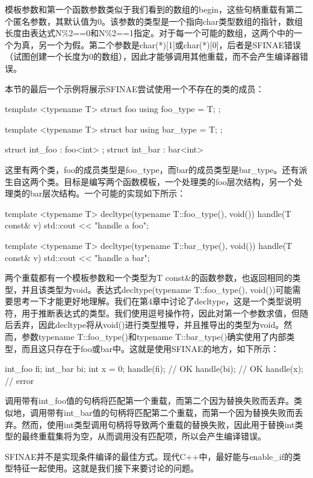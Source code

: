 模板参数和第一个函数参数类似于我们看到的数组的begin，这些句柄重载有第二个匿名参数，其默认值为0。该参数的类型是一个指向char类型数组的指针，数组长度由表达式N\%2==0和N\%2==1指定。对于每一个可能的数组，这两个中的一个为真，另一个为假。第二个参数是char(*)[1]或char(*)[0]，后者是SFINAE错误（试图创建一个长度为0的数组），因此才能够调用其他重载，而不会产生编译器错误。

本节的最后一个示例将展示SFINAE尝试使用一个不存在的类的成员：

\begin{cpp}
template <typename T>
struct foo
{
	using foo_type = T;
};

template <typename T>
struct bar
{
	using bar_type = T;
};

struct int_foo : foo<int> {};
struct int_bar : bar<int> {}
\end{cpp}

这里有两个类，foo的成员类型是foo\_type，而bar的成员类型是bar\_type。还有派生自这两个类。目标是编写两个函数模板，一个处理类的foo层次结构，另一个处理类的bar层次结构。一个可能的实现如下所示：

\begin{cpp}
template <typename T>
decltype(typename T::foo_type(), void()) handle(T const& v)
{
	std::cout << "handle a foo\n";
}

template <typename T>
decltype(typename T::bar_type(), void()) handle(T const& v)
{
	std::cout << "handle a bar\n";
}
\end{cpp}

两个重载都有一个模板参数和一个类型为T const\&的函数参数，也返回相同的类型，并且该类型为void。表达式decltype(typename T::foo\_type(), void())可能需要思考一下才能更好地理解。我们在第4章中讨论了decltype，这是一个类型说明符，用于推断表达式的类型。我们使用逗号操作符，因此对第一个参数求值，但随后丢弃，因此decltype将从void()进行类型推导，并且推导出的类型为void。然而，参数typename T::foo\_type()和typename T::bar\_type()确实使用了内部类型，而且这只存在于foo或bar中。这就是使用SFINAE的地方，如下所示：

\begin{cpp}
int_foo fi;
int_bar bi;
int x = 0;
handle(fi); // OK
handle(bi); // OK
handle(x); // error
\end{cpp}

调用带有int\_foo值的句柄将匹配第一个重载，而第二个因为替换失败而丢弃。类似地，调用带有int\_bar值的句柄将匹配第二个重载，而第一个因为替换失败而丢弃。然而，使用int类型调用句柄将导致两个重载的替换失败，因此用于替换int类型的最终重载集将为空，从而调用没有匹配项，所以会产生编译错误。

SFINAE并不是实现条件编译的最佳方式。现代C++中，最好能与enable\_if的类型特征一起使用。这就是我们接下来要讨论的问题。






















